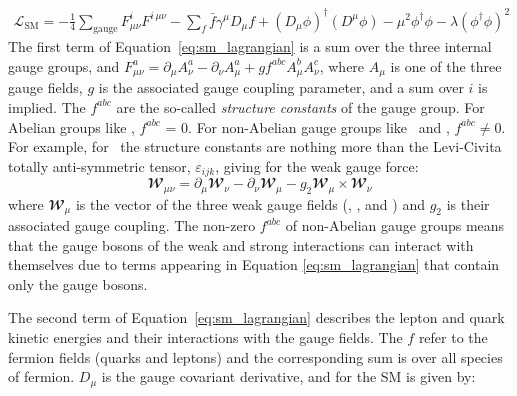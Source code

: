 \begin{align}
	\mathcal{L}_{\text{SM}} = -\frac{1}{4} \sum\limits_{\text{gauge}} \mathit{F}_{\mu \nu}^i \mathit{F}^{i\,\mu\nu}
	- \sum\limits_{f} \bar{f}\gamma^{\mu} \mathit{D}_{\mu} f 
	+  (\mathit{D}_{\mu} \phi)^{\dagger} (\mathit{D}^{\mu} \phi) - \mu^2 \phi^{\dagger}\phi - \lambda(\phi^{\dagger}\phi)^2
	\label{eq:sm_lagrangian}
\end{align}
\noindent
The first term of Equation~\ref{eq:sm_lagrangian} is a sum over the three internal gauge groups,  and $\mathit{F}^a_{\mu \nu} = \partial_{\mu} \mathit{A}_{\nu}^a - \partial_{\nu} \mathit{A}_{\mu}^a + g f^{abc} \mathit{A}_{\mu}^{b}\mathit{A}_{\nu}^{c}$, where $\mathit{A}_{\mu}$ is one of the
three gauge fields, $g$ is the associated gauge coupling parameter, and a sum over $i$ is implied. The $f^{abc}$ are the so-called
\textit{structure constants} of the gauge group. For Abelian groups like \Uone, $f^{abc}$ = 0.
For non-Abelian gauge groups like \SUtwo~and \SUthree, $f^{abc} \ne 0$. For example, for
\SUtwo~the structure constants are nothing more than the Levi-Civita totally anti-symmetric tensor, 
$\varepsilon_{ijk}$, giving for the weak gauge force:
\begin{equation}
	\mathbfcal{W}_{\mu \nu} = \partial_{\mu} \mathbfcal{W}_{\nu} - \partial_{\nu} \mathbfcal{W}_{\mu} - g_2 \mathbfcal{W}_{\mu} \times \mathbfcal{W}_{\nu}
\end{equation}
where $\mathbfcal{W}_{\mu}$ is the vector of the three weak gauge fields (\fieldWone, \fieldWtwo, and \fieldWthree) and $g_2$ is their associated gauge coupling. The non-zero $f^{abc}$ of non-Abelian gauge groups means that the gauge bosons of
the weak and strong interactions can interact with themselves due to terms appearing in Equation
\ref{eq:sm_lagrangian} that contain only the gauge bosons.

The second term of Equation~\ref{eq:sm_lagrangian} describes the lepton and quark kinetic energies and their interactions with the gauge fields.
The $f$ refer to the fermion fields (quarks and leptons) and the corresponding sum is over all
species of fermion. $\mathit{D}_{\mu}$ is the gauge covariant derivative, and for the SM is
given by:


